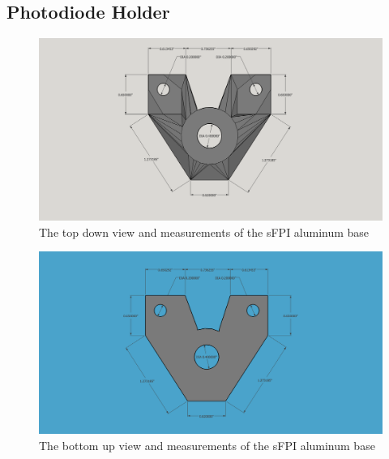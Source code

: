 \documentclass[12pt,journal]{IEEEtran}
\begin{document}
\begin{appendices}
\newpage

\subsection{Photodiode Holder} \label{ss:diode_holder}

\begin{figure}[h!]
  \centering
	\includegraphics[width=\textwidth]{./mechanical/diode_holder_top.png}
	\caption[Cavity Mounts]{The top down view and measurements of the sFPI aluminum base}
	\label{fig:diode_holder-top}
\end{figure}  
\newpage

\begin{figure}[h!]
  \centering
	\includegraphics[width=\textwidth]{./mechanical/diode_holder_bottom.png}
	\caption[Cavity Mounts]{The bottom up view and measurements of the sFPI aluminum base}
	\label{fig:diode_holder-bottom}
\end{figure} 
\newpage 


\end{appendices}
\end{document}
